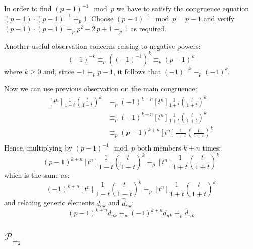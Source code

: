 In order to find $(p-1)^{-1}\mod p$ we have to satisfy the congruence equation
$(p-1) \cdot (p-1)^{-1} \equiv_{p} 1$. Choose $(p-1)^{-1}\mod p = p-1$ and
verify $(p-1) \cdot (p-1) \equiv_{p} p^{2} -2\,p +1 \equiv_{p} 1$ as required.

Another useful observation concerns raising to negative powers:
\begin{displaymath}
    (-1)^{-k} \equiv_{p} \left((-1)^{-1}\right)^{k} \equiv_{p} (p-1)^k
\end{displaymath}
where $k \geq 0$ and, since $-1 \equiv_{p} p-1$, it follows that
$(-1)^{-k} \equiv_{p} (-1)^k$.

Now we can use previous observation on the main congruence:
\begin{displaymath}
    \begin{split}
        [t^n]\frac{1}{1-t}\left(\frac{t}{1-t}\right)^k 
            &\equiv_{p} (-1)^{k-n}[t^n]\frac{1}{1+t}\left(\frac{t}{1+t}\right)^k \\
            &\equiv_{p} (-1)^{k+n}[t^n]\frac{1}{1+t}\left(\frac{t}{1+t}\right)^k \\
            &\equiv_{p} (p-1)^{k+n}[t^n]\frac{1}{1+t}\left(\frac{t}{1+t}\right)^k \\
    \end{split}
\end{displaymath}
Hence, multiplying by $(p-1)^{-1}\mod p$ both members $k+n$ times:
\begin{displaymath}
    (p-1)^{k+n}[t^n]\frac{1}{1-t}\left(\frac{t}{1-t}\right)^k 
        \equiv_{p} [t^n]\frac{1}{1+t}\left(\frac{t}{1+t}\right)^k 
\end{displaymath}
which is the same as:
\begin{displaymath}
    (-1)^{k+n}[t^n]\frac{1}{1-t}\left(\frac{t}{1-t}\right)^k \equiv_{p} [t^n]\frac{1}{1+t}\left(\frac{t}{1+t}\right)^k 
\end{displaymath}
and relating generic elements $d_{nk}$ and $\hat{d}_{nk}$:
\begin{equation}
    \label{eq:general:congruence:over:pascal:arrays}
    (p-1)^{k+n}d_{nk}\equiv_{p}(-1)^{k+n}d_{nk} \equiv_{p} \hat{d}_{nk}
\end{equation}

\subsection{$\mathcal{P}_{\equiv_{2}}$} 

